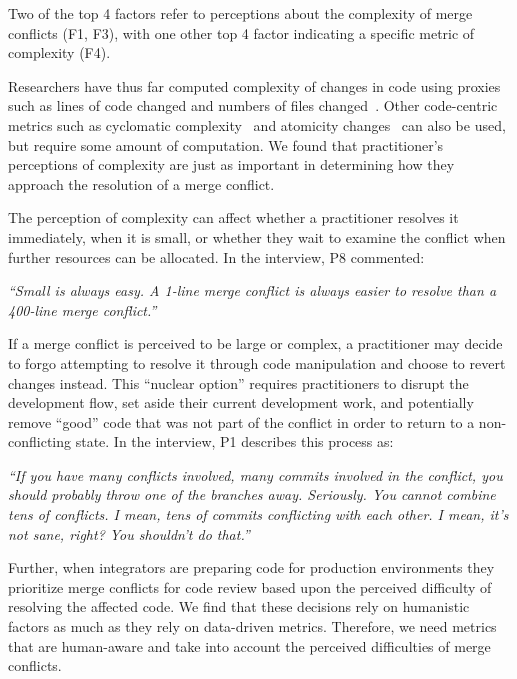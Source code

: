 \label{artifact-based-factors}
Two of the top 4 factors refer to perceptions about the complexity of merge conflicts (F1, F3), with one other top 4 factor indicating a specific metric of complexity (F4).

Researchers have thus far computed complexity of changes in code using proxies such as lines of code changed and numbers of files changed~\cite{khoshgoftaar1990predicting}.
Other code-centric metrics such as cyclomatic complexity~\cite{fenton2000quantitative}\cite{mccabe1976complexity} and atomicity changes~\cite{khelladi2016ad} can also be used, but require some amount of computation.
We found that practitioner's perceptions of complexity are just as important in determining how they approach the resolution of a merge conflict.

The perception of complexity can affect whether a practitioner resolves it immediately, when it is small, or whether they wait to examine the conflict when further resources can be allocated.
In the interview, P8 commented:
\begin{displayquote}
\textit{``Small is always easy. A 1-line merge conflict is always easier to resolve than a 400-line merge conflict.''}
\end{displayquote}

If a merge conflict is perceived to be large or complex, a practitioner may decide to forgo attempting to resolve it through code manipulation and choose to revert changes instead.
This ``nuclear option'' requires practitioners to disrupt the development flow, set aside their current development work, and potentially remove ``good'' code that was not part of the conflict in order to return to a non-conflicting state.
In the interview, P1 describes this process as:
\begin{displayquote}
\textit{``If you have many conflicts involved, many commits involved in the conflict, you should probably throw one of the branches away. Seriously. You cannot combine tens of conflicts. I mean, tens of commits conflicting with each other. I mean, it's not sane, right? You shouldn't do that.''}
\end{displayquote}

Further, when integrators are preparing code for production environments they prioritize merge conflicts for code review based upon the perceived difficulty of resolving the affected code.
We find that these decisions rely on humanistic factors as much as they rely on data-driven metrics.
Therefore, we need metrics that are human-aware and take into account the perceived difficulties of merge conflicts.

